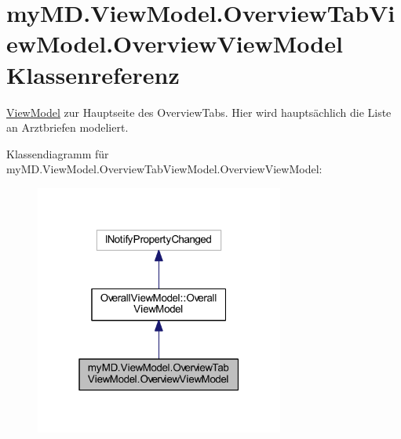 \hypertarget{classmy_m_d_1_1_view_model_1_1_overview_tab_view_model_1_1_overview_view_model}{}\section{my\+M\+D.\+View\+Model.\+Overview\+Tab\+View\+Model.\+Overview\+View\+Model Klassenreferenz}
\label{classmy_m_d_1_1_view_model_1_1_overview_tab_view_model_1_1_overview_view_model}


\mbox{\hyperlink{namespacemy_m_d_1_1_view_model}{View\+Model}} zur Hauptseite des Overview\+Tabs. Hier wird hauptsächlich die Liste an Arztbriefen modeliert.  




Klassendiagramm für my\+M\+D.\+View\+Model.\+Overview\+Tab\+View\+Model.\+Overview\+View\+Model\+:\nopagebreak
\begin{figure}[H]
\begin{center}
\leavevmode
\includegraphics[width=232pt]{classmy_m_d_1_1_view_model_1_1_overview_tab_view_model_1_1_overview_view_model__inherit__graph}
\end{center}
\end{figure}


